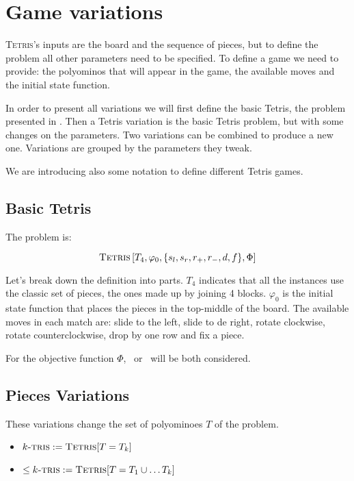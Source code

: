 \section{Game variations}

\textsc{Tetris}'s inputs are the board and the sequence of pieces, but to define the problem all other parameters need to be specified. To define a game we need to provide: the polyominos that will appear in the game, the available moves and the initial state function.

In order to present all variations we will first define the basic Tetris, the problem presented in \cite{TIH}. Then a Tetris variation is the basic Tetris problem, but with some changes on the parameters. Two variations can be combined to produce a new one. Variations are grouped by the parameters they tweak.

We are introducing also some notation to define different Tetris games. 

\subsection{Basic Tetris}

The problem is:

$$\textsc{Tetris}\left[T_4,\varphi_0, \{s_l,s_r, r_+, r_-, d, f \},\Phi \right]$$

Let's break down the definition into parts. $T_4$ indicates that all the instances use the classic set of pieces, the ones made up by joining 4 blocks. $\varphi_0$ is the initial state function that places the pieces in the top-middle of the board. The available moves in each match are: slide to the left, slide to de right, rotate clockwise, rotate counterclockwise, drop by one row and fix a piece. 

For the objective function $\Phi$, \clearing\ or \survival\ will be both considered.


\subsection{Pieces Variations}

These variations change the set of polyominoes $T$ of the problem. 

\begin{itemize}

  \item $k\textsc{-tris} := \textsc{Tetris}[T = T_k]$ 

  \item $\leq k\textsc{-tris} := \textsc{Tetris}[T = T_1 \cup \dots T_k]$

\end{itemize}

